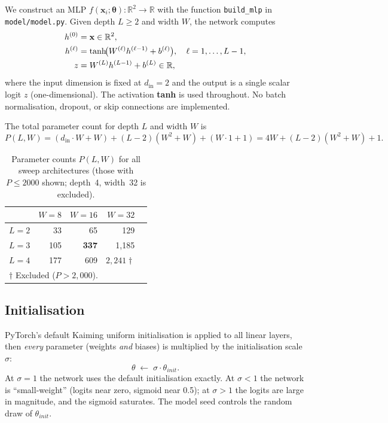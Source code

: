 \documentclass[12pt,a4paper]{article}
\newcommand{\R}{\mathbb{R}}
\newcommand{\btheta}{\boldsymbol{\theta}}
\newcommand{\bx}{\mathbf{x}}
\begin{document}
We construct an MLP $f(\bx_i; \btheta): \mathbb{R}^2 \rightarrow \mathbb{R}$  with the function
\texttt{build\_mlp} in \texttt{model/model.py}.
Given depth $L \geq 2$ and width $W$, the network computes
\begin{align}
  h^{(0)} &= \bx \in \R^2, \notag\\
  h^{(\ell)} &= \tanh\!\bigl(W^{(\ell)} h^{(\ell-1)} + b^{(\ell)}\bigr),
    \quad \ell = 1, \ldots, L-1, \notag\\
  z &= W^{(L)} h^{(L-1)} + b^{(L)} \in \R, \notag
\end{align}
where the input dimension is fixed at $d_{\mathrm{in}}=2$ and the output is a
single scalar logit $z$ (one-dimensional). The activation \textbf{tanh} is used throughout.  No batch normalisation, dropout, or skip connections are implemented.

The total parameter count for depth $L$ and width $W$ is
\begin{equation}
  P(L, W) = (d_{\mathrm{in}} \cdot W + W)
           + (L-2)(W^2 + W)
           + (W \cdot 1 + 1)
           = 4W + (L-2)(W^2 + W) + 1.
  \label{eq:param_count}
\end{equation}

\begin{table}[H]
  \centering
  \caption{Parameter counts $P(L,W)$ for all sweep architectures
           (those with $P \leq 2000$ shown; depth~4, width~32 is excluded).}
  \label{tab:params}
  \begin{tabular}{@{}lrrrr@{}}
    \toprule
    & $W=8$ & $W=16$ & $W=32$ \\
    \midrule
    $L=2$ & 33 & 65 & 129 \\
    $L=3$ & 105 & \textbf{337} & 1{,}185 \\
    $L=4$ & 177 & 609 & $2{,}241\dagger$ \\
    \bottomrule
    \multicolumn{4}{l}{$\dagger$ Excluded ($P > 2{,}000$).}
  \end{tabular}
\end{table}

\subsection{Initialisation}
\label{ssec:init}

PyTorch's default Kaiming uniform initialisation is applied to all linear
layers, then \emph{every} parameter (weights \emph{and} biases) is multiplied by the initialisation scale $\sigma$:
\begin{equation}
  \theta \;\leftarrow\; \sigma \cdot \theta_{init}.
  \label{eq:init_scale}
\end{equation}
At $\sigma=1$ the network uses the default initialisation exactly. At $\sigma < 1$ the network is ``small-weight'' (logits near zero, sigmoid near 0.5); at $\sigma > 1$ the logits are large in magnitude, and the sigmoid
saturates. The model seed controls the random draw of $\theta_{init}$.
\end{document}
